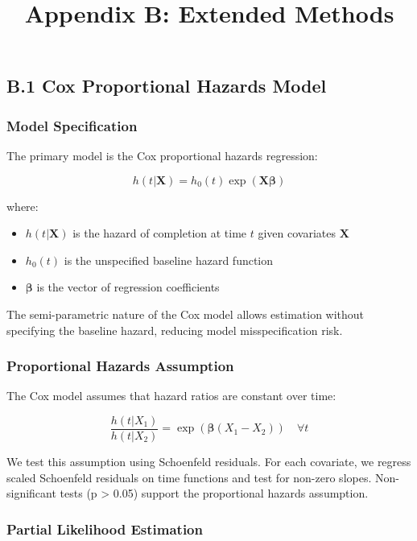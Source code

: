 \documentclass[
  12pt,
  letterpaper,
]{article}
\title{Appendix B: Extended Methods}
\author{}
\date{}
\providecommand{\tightlist}{%
  \setlength{\itemsep}{0pt}\setlength{\parskip}{0pt}}
\begin{document}
\maketitle


\subsection{B.1 Cox Proportional Hazards
Model}\label{b.1-cox-proportional-hazards-model}

\subsubsection{Model Specification}\label{model-specification}

The primary model is the Cox proportional hazards regression:

\[
h(t | \mathbf{X}) = h_0(t) \exp(\mathbf{X}\boldsymbol{\beta})
\]

where:

\begin{itemize}
\tightlist
\item
  \(h(t | \mathbf{X})\) is the hazard of completion at time \(t\) given
  covariates \(\mathbf{X}\)
\item
  \(h_0(t)\) is the unspecified baseline hazard function
\item
  \(\boldsymbol{\beta}\) is the vector of regression coefficients
\end{itemize}

The semi-parametric nature of the Cox model allows estimation without
specifying the baseline hazard, reducing model misspecification risk.

\subsubsection{Proportional Hazards
Assumption}\label{proportional-hazards-assumption}

The Cox model assumes that hazard ratios are constant over time:

\[
\frac{h(t | X_1)}{h(t | X_2)} = \exp(\boldsymbol{\beta}(X_1 - X_2)) \quad \forall t
\]

We test this assumption using Schoenfeld residuals. For each covariate,
we regress scaled Schoenfeld residuals on time functions and test for
non-zero slopes. Non-significant tests (p \textgreater{} 0.05) support
the proportional hazards assumption.

\subsubsection{Partial Likelihood
Estimation}\label{partial-likelihood-estimation}
\end{document}
